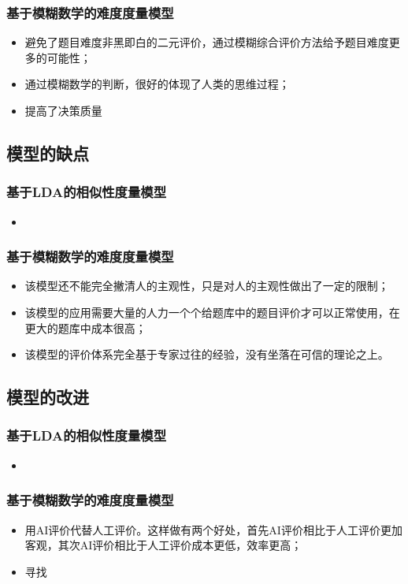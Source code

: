 \subsubsection{基于模糊数学的难度度量模型}

\begin{itemize}
    \item 避免了题目难度非黑即白的二元评价，通过模糊综合评价方法给予题目难度更多的可能性；
    \item 通过模糊数学的判断，很好的体现了人类的思维过程；
    \item 提高了决策质量
\end{itemize}

\subsection{模型的缺点}

\subsubsection{基于LDA的相似性度量模型}

\begin{itemize}
    \item 
\end{itemize}

\subsubsection{基于模糊数学的难度度量模型}

\begin{itemize}
    \item 该模型还不能完全撇清人的主观性，只是对人的主观性做出了一定的限制；
    \item 该模型的应用需要大量的人力一个个给题库中的题目评价才可以正常使用，在更大的题库中成本很高；
    \item 该模型的评价体系完全基于专家过往的经验，没有坐落在可信的理论之上。
\end{itemize}

\subsection{模型的改进}

\subsubsection{基于LDA的相似性度量模型}

\begin{itemize}
    \item 
\end{itemize}

\subsubsection{基于模糊数学的难度度量模型}

\begin{itemize}
    \item 用AI评价代替人工评价。这样做有两个好处，首先AI评价相比于人工评价更加客观，其次AI评价相比于人工评价成本更低，效率更高；
    \item 寻找
\end{itemize}